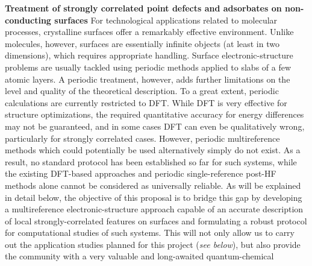 \documentclass[a4paper,11pt,headings=normal]{scrartcl}
\begin{document}
\begin{itemize}
\noindent
\textbf{Treatment of strongly correlated point defects and adsorbates on 
non-conducting surfaces} For technological applications related to molecular 
processes, crystalline surfaces offer a remarkably effective environment. Unlike 
molecules, however, surfaces are essentially infinite objects (at least in two 
dimensions), which requires appropriate handling.
Surface electronic-structure problems are usually tackled using periodic 
methods applied to slabs of a few atomic layers. 
A periodic treatment, however, adds further limitations on the level and quality 
of the theoretical description. To a great extent, periodic calculations are 
currently restricted to DFT. While DFT is very effective for structure 
optimizations, the required quantitative accuracy for energy differences may not 
be guaranteed, and in some cases DFT can even be qualitatively wrong, particularly 
for strongly correlated cases. 
However, periodic multireference methods which could 
potentially be used alternatively simply do not exist. As a 
result, no standard protocol has been established so far for such systems, 
while the existing DFT-based approaches and periodic single-reference post-HF 
methods\autocite{pisani2008, Booth2013_, usvyat2015, delben2, 
Booth2016, McClain2017, grueneis2018, Wang2020} alone cannot 
be considered as universally reliable. As will be explained in detail below, the 
objective of this proposal is to bridge this gap by developing a 
multireference electronic-structure approach capable of an accurate description of 
local strongly-correlated features on surfaces and formulating a robust protocol 
for computational studies of such systems. This will not only allow us to carry 
out the application studies planned for this project (\textit{see below}), but 
also provide the community with a very valuable and long-awaited quantum-chemical 

\end{itemize}
\end{document}
